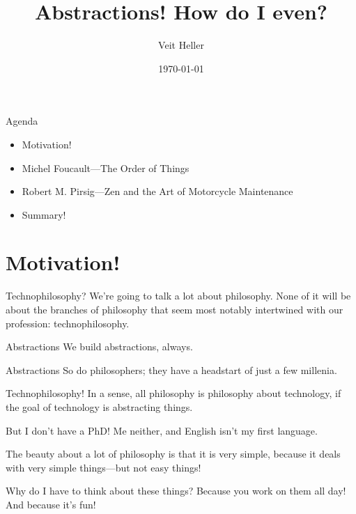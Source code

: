 \documentclass[aspectratio=169]{beamer}
\title{Abstractions! How do I even?}
\date{\today}
\author{Veit Heller}
\institute{EnthusiastiCon 2019}
\begin{document}
  \maketitle
  \begin{frame}{Agenda}
    \begin{itemize}
      \item Motivation!
      \item Michel Foucault—The Order of Things
      \item Robert M. Pirsig—Zen and the Art of Motorcycle Maintenance
      \item Summary!
    \end{itemize}
  \end{frame}
  \section{Motivation!}
  \begin{frame}{Technophilosophy?}
    We’re going to talk a lot about philosophy. None of it will be about the
    branches of philosophy that seem most notably intertwined with our
    profession: technophilosophy.
  \end{frame}
  \begin{frame}{Abstractions}
    We build abstractions, always.
  \end{frame}
  \begin{frame}{Abstractions}
    So do philosophers; they have a headstart of just a few millenia.
  \end{frame}
  \begin{frame}{Technophilosophy!}
    In a sense, all philosophy is philosophy about technology, if the goal of
    technology is abstracting things.
  \end{frame}
  \begin{frame}{But I don’t have a PhD!}
    Me neither, and English isn’t my first language.

    The beauty about a lot of philosophy is that it is very simple, because it
    deals with very simple things—but not easy things!
  \end{frame}
  \begin{frame}{Why do I have to think about these things?}
    Because you work on them all day! And because it’s fun!
  \end{frame}
\end{document}
